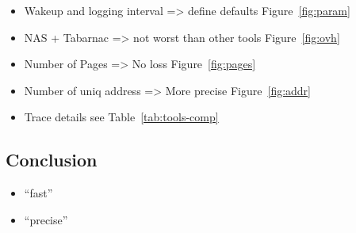 \begin{itemize}
    \item Wakeup and logging interval => define defaults Figure~\ref{fig:param}
    \item NAS + Tabarnac => not worst than other tools Figure~\ref{fig:ovh}
    \item Number of Pages => No loss Figure~\ref{fig:pages}
    \item Number of uniq address => More precise Figure~\ref{fig:addr}
    \item Trace details see Table~\ref{tab:tools-comp}
\end{itemize}

    \subsection{Conclusion}
    \label{sec:expe-cncl}

    \begin{itemize}
        \item ``fast''
        \item ``precise''
    \end{itemize}
